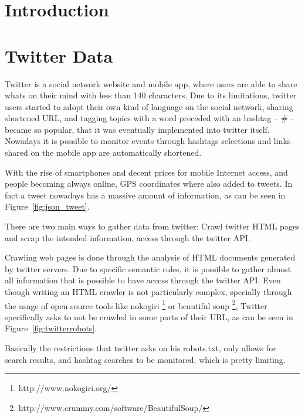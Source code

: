 \label{ch:clustering_tweets}

\section{Introduction}
\label{sec:adapting_the_som_to_the_social_web}

\section{Twitter Data}
\label{sec:crawling_twitter}
Twitter is a social network website and mobile app, where users are able to share whats on their mind with less than 140 characters. Due to its limitations, twitter users started to adopt their own kind of language on the social network, sharing shortened \ac{URL}, and tagging topics with a word preceded with an hashtag -- \# -- became so popular, that it was eventually implemented into twitter itself. Nowadays it is possible to monitor events through hashtags selections and links shared on the mobile app are automatically shortened.   

With the rise of smartphones and decent prices for mobile Internet access, and people becoming always online, GPS coordinates where also added to tweets. In fact a tweet nowadays has a massive amount of information, as can be seen in Figure~\ref{fig:json_tweet}.



There are two main ways to gather data from twitter: Crawl twitter HTML pages and scrap the intended information, access through the twitter API.

Crawling web pages is done through the analysis of HTML documents generated by twitter servers. Due to specific semantic rules, it is possible to gather almost all information that is possible to have access through the twitter API. Even though writing an HTML crawler is not particularly complex, specially through the usage of open source tools like nokogiri \footnote{http://www.nokogiri.org/} or beautiful soup \footnote{http://www.crummy.com/software/BeautifulSoup/}, Twitter specifically asks to not be crawled in some parts of their \ac{URL}, as can be seen in Figure~\ref{fig:twitterrobots}. 

Basically the restrictions that twitter asks on his robots.txt, only allows for search results, and hashtag searches to be monitored, which is pretty limiting.

